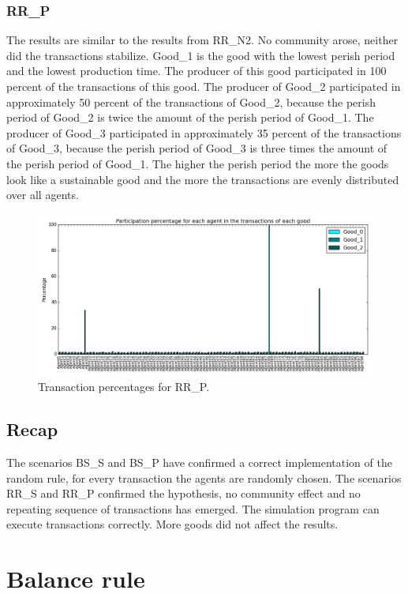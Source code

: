 \documentclass[twoside,openright]{uva-bachelor-thesis}
\begin{document}
\subsubsection{RR\_P}
The results are similar to the results from RR\_N2. No community arose, neither did the transactions stabilize. Good\_1 is the good with the lowest perish period and the lowest production time. The producer of this good participated in 100 percent of the transactions of this good. The producer of Good\_2 participated in approximately 50 percent of the transactions of Good\_2, because the perish period of Good\_2 is twice the amount of the perish period of Good\_1. The producer of Good\_3 participated in approximately 35 percent of the transactions of Good\_3, because the perish period of Good\_3 is three times the amount of the perish period of Good\_1. The higher the perish period the more the goods look like a sustainable good and the more the transactions are evenly distributed over all agents.\\
\begin{figure}[h!]
\centering
\includegraphics[scale=0.4]{Simulation_figures/RR_P/Figure1_20k}
\caption{Transaction percentages for RR\_P.}
\end{figure}

\subsection{Recap}
The scenarios BS\_S and BS\_P have confirmed a correct implementation of the random rule, for every transaction the agents are randomly chosen. The scenarios RR\_S and RR\_P confirmed the hypothesis, no community effect and no repeating sequence of transactions has emerged. The simulation program can execute transactions correctly. More goods did not affect the results.

\section{Balance rule}
\end{document}
